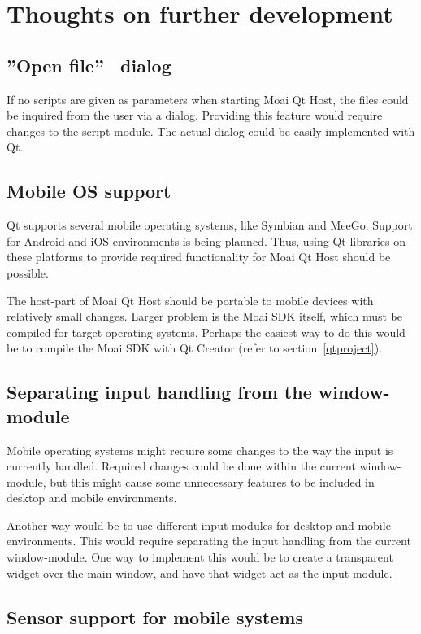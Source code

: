 \chapter{Thoughts on further development}

\section{''Open file'' --dialog}

If no scripts are given as parameters when starting Moai Qt Host, the files could be inquired from the user via a dialog.
Providing this feature would require changes to the script-module. The actual dialog could be easily implemented with Qt.

\section{Mobile OS support}

Qt supports several mobile operating systems, like Symbian and MeeGo. 
Support for Android and iOS environments is being planned.
Thus, using Qt-libraries on these platforms to provide required functionality for Moai Qt Host should be possible.

The host-part of Moai Qt Host should be portable to mobile devices with relatively small changes. 
Larger problem is the Moai SDK itself, which must be compiled for target operating systems. 
Perhaps the easiest way to do this would be to compile the Moai SDK with Qt Creator (refer to section~\ref{qtproject}).

\section{Separating input handling from the window-module}

Mobile operating systems might require some changes to the way the input is currently handled.
Required changes could be done within the current window-module, but this might cause some unnecessary features to be included in desktop and mobile environments.

Another way would be to use different input modules for desktop and mobile environments.
This would require separating the input handling from the current window-module.
One way to implement this would be to create a transparent widget over the main window, and have that widget act as the input module.

\section{Sensor support for mobile systems}

